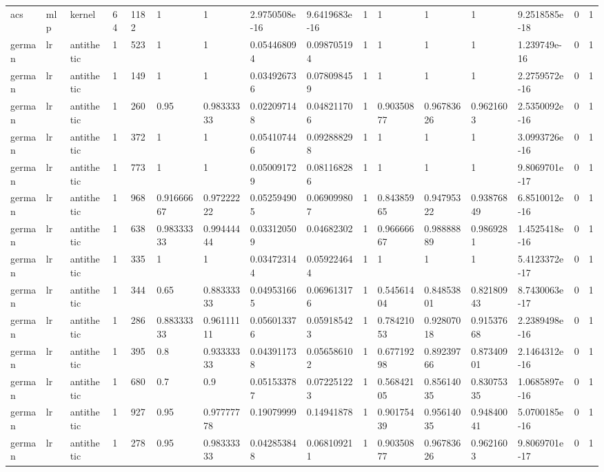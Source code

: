 \begin{tabular}{llllllllllllllll}
acs & mlp & kernel & 64 & 1182 & 1 & 1 & 2.9750508e-16 & 9.6419683e-16 & 1 & 1 & 1 & 1 & 9.2518585e-18 & 0 & 1 \\
german & lr & antithetic & 1 & 523 & 1 & 1 & 0.054468094 & 0.098705194 & 1 & 1 & 1 & 1 & 1.239749e-16 & 0 & 1 \\
german & lr & antithetic & 1 & 149 & 1 & 1 & 0.034926736 & 0.078098459 & 1 & 1 & 1 & 1 & 2.2759572e-16 & 0 & 1 \\
german & lr & antithetic & 1 & 260 & 0.95 & 0.98333333 & 0.022097148 & 0.048211706 & 1 & 0.90350877 & 0.96783626 & 0.9621603 & 2.5350092e-16 & 0 & 1 \\
german & lr & antithetic & 1 & 372 & 1 & 1 & 0.054107446 & 0.092888298 & 1 & 1 & 1 & 1 & 3.0993726e-16 & 0 & 1 \\
german & lr & antithetic & 1 & 773 & 1 & 1 & 0.050091729 & 0.081168286 & 1 & 1 & 1 & 1 & 9.8069701e-17 & 0 & 1 \\
german & lr & antithetic & 1 & 968 & 0.91666667 & 0.97222222 & 0.052594905 & 0.069099807 & 1 & 0.84385965 & 0.94795322 & 0.93876849 & 6.8510012e-16 & 0 & 1 \\
german & lr & antithetic & 1 & 638 & 0.98333333 & 0.99444444 & 0.033120509 & 0.04682302 & 1 & 0.96666667 & 0.98888889 & 0.9869281 & 1.4525418e-16 & 0 & 1 \\
german & lr & antithetic & 1 & 335 & 1 & 1 & 0.034723144 & 0.059224644 & 1 & 1 & 1 & 1 & 5.4123372e-17 & 0 & 1 \\
german & lr & antithetic & 1 & 344 & 0.65 & 0.88333333 & 0.049531665 & 0.069613176 & 1 & 0.54561404 & 0.84853801 & 0.82180943 & 8.7430063e-17 & 0 & 1 \\
german & lr & antithetic & 1 & 286 & 0.88333333 & 0.96111111 & 0.056013376 & 0.059185423 & 1 & 0.78421053 & 0.92807018 & 0.91537668 & 2.2389498e-16 & 0 & 1 \\
german & lr & antithetic & 1 & 395 & 0.8 & 0.93333333 & 0.043911738 & 0.056586102 & 1 & 0.67719298 & 0.89239766 & 0.87340901 & 2.1464312e-16 & 0 & 1 \\
german & lr & antithetic & 1 & 680 & 0.7 & 0.9 & 0.051533787 & 0.072251223 & 1 & 0.56842105 & 0.85614035 & 0.83075335 & 1.0685897e-16 & 0 & 1 \\
german & lr & antithetic & 1 & 927 & 0.95 & 0.97777778 & 0.19079999 & 0.14941878 & 1 & 0.90175439 & 0.95614035 & 0.94840041 & 5.0700185e-16 & 0 & 1 \\
german & lr & antithetic & 1 & 278 & 0.95 & 0.98333333 & 0.042853848 & 0.068109211 & 1 & 0.90350877 & 0.96783626 & 0.9621603 & 9.8069701e-17 & 0 & 1 \\

\end{tabular}
